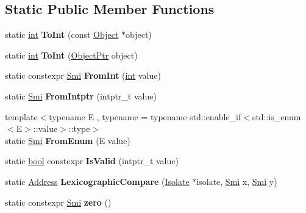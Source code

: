 \subsection*{Static Public Member Functions}
\begin{DoxyCompactItemize}
\item 
\mbox{\label{classv8_1_1internal_1_1Smi_a9db00eeafea7bb0333ac1f3237c53e16}} 
static \mbox{\hyperlink{classint}{int}} {\bfseries To\+Int} (const \mbox{\hyperlink{classv8_1_1internal_1_1Object}{Object}} $\ast$object)
\item 
\mbox{\label{classv8_1_1internal_1_1Smi_af3fd33049afe50ac28b0693a3a6095b2}} 
static \mbox{\hyperlink{classint}{int}} {\bfseries To\+Int} (\mbox{\hyperlink{classv8_1_1internal_1_1ObjectPtr}{Object\+Ptr}} object)
\item 
\mbox{\label{classv8_1_1internal_1_1Smi_a4d9aeb9edce6888fc9f89aa872f05f73}} 
static constexpr \mbox{\hyperlink{classv8_1_1internal_1_1Smi}{Smi}} {\bfseries From\+Int} (\mbox{\hyperlink{classint}{int}} value)
\item 
\mbox{\label{classv8_1_1internal_1_1Smi_a09c407bf3901cc12dc1f691bf532c4cc}} 
static \mbox{\hyperlink{classv8_1_1internal_1_1Smi}{Smi}} {\bfseries From\+Intptr} (intptr\+\_\+t value)
\item 
\mbox{\label{classv8_1_1internal_1_1Smi_a26c941b45038c34db30f0330f2262d7a}} 
{\footnotesize template$<$typename E , typename  = typename std\+::enable\+\_\+if$<$std\+::is\+\_\+enum$<$\+E$>$\+::value$>$\+::type$>$ }\\static \mbox{\hyperlink{classv8_1_1internal_1_1Smi}{Smi}} {\bfseries From\+Enum} (E value)
\item 
\mbox{\label{classv8_1_1internal_1_1Smi_aff6f15a66413367d4b83ff12738a272f}} 
static \mbox{\hyperlink{classbool}{bool}} constexpr {\bfseries Is\+Valid} (intptr\+\_\+t value)
\item 
\mbox{\label{classv8_1_1internal_1_1Smi_ab565515e642aed20577d54e58012b70c}} 
static \mbox{\hyperlink{classuintptr__t}{Address}} {\bfseries Lexicographic\+Compare} (\mbox{\hyperlink{classv8_1_1internal_1_1Isolate}{Isolate}} $\ast$isolate, \mbox{\hyperlink{classv8_1_1internal_1_1Smi}{Smi}} x, \mbox{\hyperlink{classv8_1_1internal_1_1Smi}{Smi}} y)
\item 
\mbox{\label{classv8_1_1internal_1_1Smi_a66726cd97dc8e5f0c3e1282b681a559b}} 
static constexpr \mbox{\hyperlink{classv8_1_1internal_1_1Smi}{Smi}} {\bfseries zero} ()
\end{DoxyCompactItemize}
